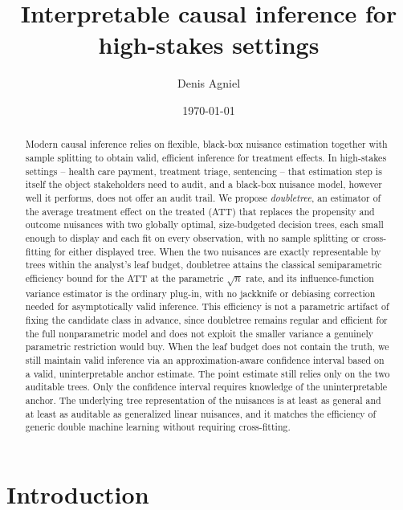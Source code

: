 \documentclass[12pt]{article}
\title{Interpretable causal inference for high-stakes settings}
\author{Denis Agniel}
\date{\today}
\begin{document}
\maketitle
\begin{abstract}
Modern causal inference relies on flexible, black-box nuisance estimation together with sample splitting to obtain valid, efficient inference for treatment effects. In high-stakes settings -- health care payment, treatment triage, sentencing -- that estimation step is itself the object stakeholders need to audit, and a black-box nuisance model, however well it performs, does not offer an audit trail. We propose \emph{doubletree}, an estimator of the average treatment effect on the treated (ATT) that replaces the propensity and outcome nuisances with two globally optimal, size-budgeted decision trees, each small enough to display and each fit on every observation, with no sample splitting or cross-fitting for either displayed tree. When the two nuisances are exactly representable by trees within the analyst's leaf budget, doubletree attains the classical semiparametric efficiency bound for the ATT at the parametric $\sqrt n$ rate, and its influence-function variance estimator is the ordinary plug-in, with no jackknife or debiasing correction needed for asymptotically valid inference. This efficiency is not a parametric artifact of fixing the candidate class in advance, since doubletree remains regular and efficient for the full nonparametric model and does not exploit the smaller variance a genuinely parametric restriction would buy. When the leaf budget does not contain the truth, we still maintain valid inference via an approximation-aware confidence interval based on a valid, uninterpretable anchor estimate. The point estimate still relies only on the two auditable trees. Only the confidence interval requires knowledge of the uninterpretable anchor. The underlying tree representation of the nuisances is at least as general and at least as auditable as generalized linear nuisances, and it matches the efficiency of generic double machine learning without requiring cross-fitting.
\end{abstract}

\section{Introduction}
\end{document}
